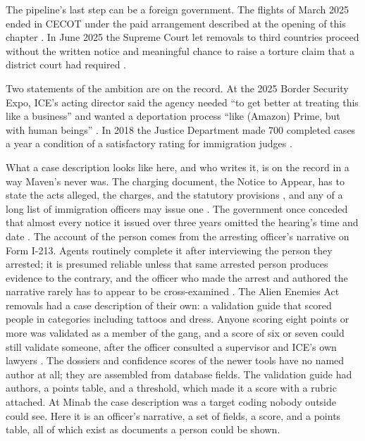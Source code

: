 The pipeline's last step can be a foreign government. The flights of March 2025 ended in CECOT under the paid arrangement described at the opening of this chapter \autocite{Renteria2025ElSalvador}. In June 2025 the Supreme Court let removals to third countries proceed without the written notice and meaningful chance to raise a torture claim that a district court had required \autocite{dvd2025}.

Two statements of the ambition are on the record. At the 2025 Border Security Expo, ICE's acting director said the agency needed “to get better at treating this like a business” and wanted a deportation process “like (Amazon) Prime, but with human beings” \autocite{MacDonaldEvoy2025Prime}. In 2018 the Justice Department made 700 completed cases a year a condition of a satisfactory rating for immigration judges \autocite{eoir2018metrics}.

What a case description looks like here, and who writes it, is on the record in a way Maven's never was. The charging document, the Notice to Appear, has to state the acts alleged, the charges, and the statutory provisions \autocite{usc1229}, and any of a long list of immigration officers may issue one \autocite{cfr239_1}. The government once conceded that almost every notice it issued over three years omitted the hearing's time and date \autocite{pereira2018}. The account of the person comes from the arresting officer's narrative on Form I-213. Agents routinely complete it after interviewing the person they arrested; it is presumed reliable unless that same arrested person produces evidence to the contrary, and the officer who made the arrest and authored the narrative rarely has to appear to be cross-examined \autocite{espinoza1995,lopezmendoza1984}. The Alien Enemies Act removals had a case description of their own: a validation guide that scored people in categories including tattoos and dress. Anyone scoring eight points or more was validated as a member of the gang, and a score of six or seven could still validate someone, after the officer consulted a supervisor and ICE's own lawyers \autocite{MartinezBeltran2025Validation}. The dossiers and confidence scores of the newer tools have no named author at all; they are assembled from database fields. The validation guide had authors, a points table, and a threshold, which made it a score with a rubric attached. At Minab the case description was a target coding nobody outside could see. Here it is an officer's narrative, a set of fields, a score, and a points table, all of which exist as documents a person could be shown.
